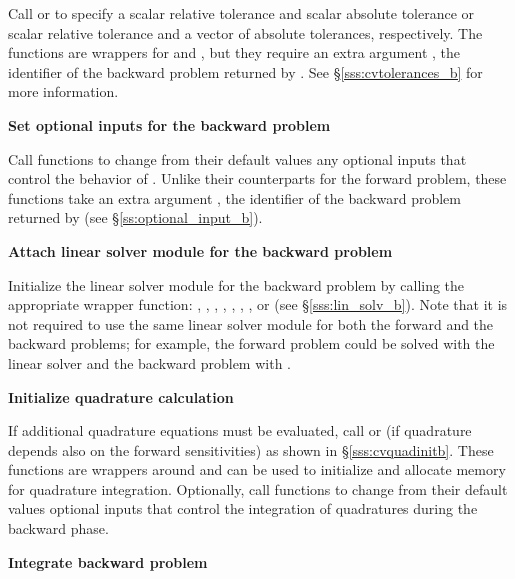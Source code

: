 \begin{Steps}
  Call  or 
  to specify a scalar relative tolerance and scalar absolute tolerance or
  scalar relative tolerance and a vector of absolute tolerances, respectively.
  The functions are wrappers for  and
  , but they require an extra argument ,
  the identifier of the backward problem returned by .
  See \S\ref{sss:cvtolerances_b} for more information.


\item
  {\bf Set optional inputs for the backward problem}

  Call  functions to change from their default values
  any optional inputs that control the behavior of {\cvodes}. Unlike
  their counterparts for the forward problem, these functions take an
  extra argument , the identifier of the backward problem returned 
  by  (see \S\ref{ss:optional_input_b}).


\item \label{i:lin_solverB}
  {\bf Attach linear solver module for the backward problem}

  Initialize the linear solver module 
  for the backward problem by calling the appropriate wrapper
  function: , , , ,
  , , , or 
  (see \S\ref{sss:lin_solv_b}).  Note that
  it is not required to use the same linear solver module for both the forward 
  and the backward problems; for example, the forward problem could be solved
  with the {\cvdense} linear solver and the backward problem with {\cvspgmr}.

\item \label{i:quadB}
  {\bf Initialize quadrature calculation}

  If additional quadrature equations must be evaluated, 
  call  or  (if quadrature depends also on the
  forward sensitivities) as shown in \S\ref{sss:cvquadinitb}. These functions are
  wrappers around  and can be used to initialize and allocate 
  memory for quadrature integration. Optionally, call  functions 
  to change from their default values optional inputs that control the integration 
  of quadratures during the backward phase.

\item
  {\bf Integrate backward problem}


\end{Steps}
